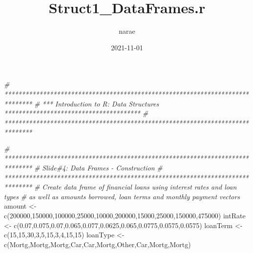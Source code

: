 \documentclass[
]{article}
\title{Struct1\_DataFrames.r}
\author{narae}
\date{2021-11-01}
\newenvironment{Shaded}{\begin{snugshade}}{\end{snugshade}}
\newcommand{\CommentTok}[1]{\textcolor[rgb]{0.56,0.35,0.01}{\textit{#1}}}
\newcommand{\DecValTok}[1]{\textcolor[rgb]{0.00,0.00,0.81}{#1}}
\newcommand{\FloatTok}[1]{\textcolor[rgb]{0.00,0.00,0.81}{#1}}
\newcommand{\FunctionTok}[1]{\textcolor[rgb]{0.00,0.00,0.00}{#1}}
\newcommand{\NormalTok}[1]{#1}
\newcommand{\OtherTok}[1]{\textcolor[rgb]{0.56,0.35,0.01}{#1}}
\newcommand{\StringTok}[1]{\textcolor[rgb]{0.31,0.60,0.02}{#1}}
\begin{document}
\maketitle

\begin{Shaded}
\begin{Highlighting}[]
\CommentTok{\# ******************************************************************************}
\CommentTok{\# *** Introduction to R: Data Structures ***************************************}
\CommentTok{\# ******************************************************************************}

\CommentTok{\# ******************************************************************************}
\CommentTok{\# Slide\#4: Data Frames {-} Construction}
\CommentTok{\# ******************************************************************************}
\CommentTok{\# Create data frame of financial loans using interest rates and loan types}
\CommentTok{\# as well as amounts borrowed, loan terms and monthly payment vectors}
\NormalTok{amount }\OtherTok{\textless{}{-}} \FunctionTok{c}\NormalTok{(}\DecValTok{200000}\NormalTok{,}\DecValTok{150000}\NormalTok{,}\DecValTok{100000}\NormalTok{,}\DecValTok{25000}\NormalTok{,}\DecValTok{10000}\NormalTok{,}\DecValTok{200000}\NormalTok{,}\DecValTok{15000}\NormalTok{,}\DecValTok{25000}\NormalTok{,}\DecValTok{150000}\NormalTok{,}\DecValTok{475000}\NormalTok{)}
\NormalTok{intRate }\OtherTok{\textless{}{-}} \FunctionTok{c}\NormalTok{(}\FloatTok{0.07}\NormalTok{,}\FloatTok{0.075}\NormalTok{,}\FloatTok{0.07}\NormalTok{,}\FloatTok{0.065}\NormalTok{,}\FloatTok{0.077}\NormalTok{,}\FloatTok{0.0625}\NormalTok{,}\FloatTok{0.065}\NormalTok{,}\FloatTok{0.0775}\NormalTok{,}\FloatTok{0.0575}\NormalTok{,}\FloatTok{0.0575}\NormalTok{)}
\NormalTok{loanTerm }\OtherTok{\textless{}{-}} \FunctionTok{c}\NormalTok{(}\DecValTok{15}\NormalTok{,}\DecValTok{15}\NormalTok{,}\DecValTok{30}\NormalTok{,}\DecValTok{3}\NormalTok{,}\DecValTok{5}\NormalTok{,}\DecValTok{15}\NormalTok{,}\DecValTok{3}\NormalTok{,}\DecValTok{4}\NormalTok{,}\DecValTok{15}\NormalTok{,}\DecValTok{15}\NormalTok{)}
\NormalTok{loanType }\OtherTok{\textless{}{-}} \FunctionTok{c}\NormalTok{(}\StringTok{\textquotesingle{}Mortg\textquotesingle{}}\NormalTok{,}\StringTok{\textquotesingle{}Mortg\textquotesingle{}}\NormalTok{,}\StringTok{\textquotesingle{}Mortg\textquotesingle{}}\NormalTok{,}\StringTok{\textquotesingle{}Car\textquotesingle{}}\NormalTok{,}\StringTok{\textquotesingle{}Car\textquotesingle{}}\NormalTok{,}\StringTok{\textquotesingle{}Mortg\textquotesingle{}}\NormalTok{,}\StringTok{\textquotesingle{}Other\textquotesingle{}}\NormalTok{,}\StringTok{\textquotesingle{}Car\textquotesingle{}}\NormalTok{,}\StringTok{\textquotesingle{}Mortg\textquotesingle{}}\NormalTok{,}\StringTok{\textquotesingle{}Mortg\textquotesingle{}}\NormalTok{)}

\end{Highlighting}
\end{Shaded}
\end{document}
